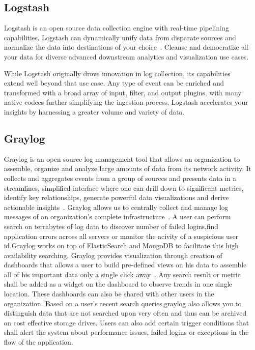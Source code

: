 \subsection{Logstash}

Logstash is an open source data collection engine with real-time
pipelining capabilities. Logstash can dynamically unify data from
disparate sources and normalize the data into destinations of your
choice~\cite{www-logstash}. Cleanse and democratize all your data for
diverse advanced downstream analytics and visualization use cases.

    While Logstash originally drove innovation in log collection, its
    capabilities extend well beyond that use case. Any type of event
    can be enriched and transformed with a broad array of input,
    filter, and output plugins, with many native codecs further
    simplifying the ingestion process. Logstash accelerates your
    insights by harnessing a greater volume and variety of data.
	
\subsection{Graylog}

Graylog is an open source log management tool that allows an
organization to assemble, organize and analyze large amounts of data
from its network activity. It collects and aggregates events from a
group of sources and presents data in a streamlines, simplified
interface where one can drill down to significant metrics, identify
key relationships, generate powerful data visualizations and derive
actionable insights~\cite{www-graylog-blog}.  Graylog allows us to
centrally collect and manage log messages of an organization's
complete infrastructure~\cite{www-graylog-optimization}. A user can
perform search on terrabytes of log data to discover number of failed
logins,find application errors across all servers or monitor the
acivity of a suspicious user id.Graylog works on top of ElasticSearch
and MongoDB to facilitate this high availability searching.  Graylog
provides visualization through creation of dashboards that allows a
user to build pre-defined views on his data to assemble all of his
important data only a single click
away~\cite{www-graylog-dashboards}. Any search result or metric shall
be added as a widget on the dashboard to observe trends in one single
location. These dashboards can also be shared with other users in the
organization. Based on a user's recent search queries,graylog also
allows you to distinguish data that are not searched upon very often
and thus can be archived on cost effective storage drives. Users can
also add certain trigger conditions that shall alert the system about
performance issues, failed logins or exceptions in the flow of the
application.
    

